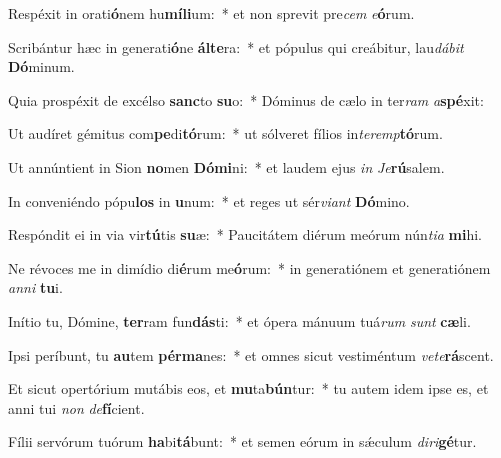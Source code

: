 \item Respéxit in orati\textbf{ó}nem hu\textbf{mí}\textbf{li}um:~* et non sprevit pre\textit{cem} \textit{e}\textbf{ó}rum.
\item Scribántur hæc in generati\textbf{ó}ne \textbf{ál}\textbf{te}ra:~* et pópulus qui creábitur, lau\textit{dá}\textit{bit} \textbf{Dó}minum.
\item Quia prospéxit de excélso \textbf{sanc}to \textbf{su}o:~* Dóminus de cælo in ter\textit{ram} \textit{a}\textbf{spé}xit:
\item Ut audíret gémitus com\textbf{pe}di\textbf{tó}rum:~* ut sólveret fílios in\textit{ter}\textit{emp}\textbf{tó}rum.
\item Ut annúntient in Sion \textbf{no}men \textbf{Dó}\textbf{mi}ni:~* et laudem ejus \textit{in} \textit{Je}\textbf{rú}salem.
\item In conveniéndo pópu\textbf{los} in \textbf{u}num:~* et reges ut sér\textit{vi}\textit{ant} \textbf{Dó}mino.
\item Respóndit ei in via vir\textbf{tú}tis \textbf{su}æ:~* Paucitátem diérum meórum nún\textit{ti}\textit{a} \textbf{mi}hi.
\item Ne révoces me in dimídio di\textbf{é}rum me\textbf{ó}rum:~* in generatiónem et generatiónem \textit{an}\textit{ni} \textbf{tu}i.
\item Inítio tu, Dómine, \textbf{ter}ram fun\textbf{dás}ti:~* et ópera mánuum tuá\textit{rum} \textit{sunt} \textbf{cæ}li.
\item Ipsi períbunt, tu \textbf{au}tem \textbf{pér}\textbf{ma}nes:~* et omnes sicut vestiméntum \textit{ve}\textit{te}\textbf{rá}scent.
\item Et sicut opertórium mutábis eos, et \textbf{mu}ta\textbf{bún}tur:~* tu autem idem ipse es, et anni tui \textit{non} \textit{de}\textbf{fí}cient.
\item Fílii servórum tuórum \textbf{ha}bi\textbf{tá}bunt:~* et semen eórum in sǽculum \textit{di}\textit{ri}\textbf{gé}tur.
